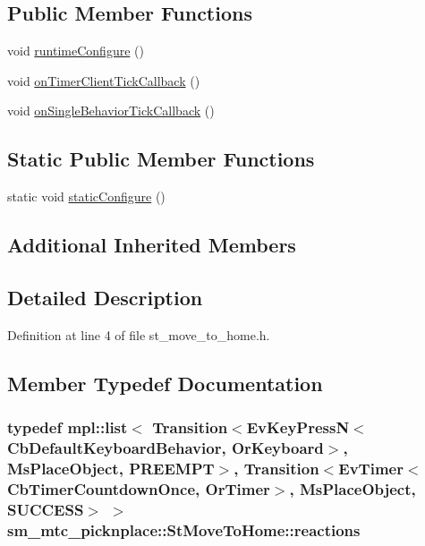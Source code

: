 \subsection*{Public Member Functions}
\begin{DoxyCompactItemize}
\item 
void \hyperlink{structsm__mtc__picknplace_1_1StMoveToHome_a7cafbff041d36ba4d3cbc1147f294a23}{runtime\+Configure} ()
\item 
void \hyperlink{structsm__mtc__picknplace_1_1StMoveToHome_adbd13708067b1a190dc1e414291b436c}{on\+Timer\+Client\+Tick\+Callback} ()
\item 
void \hyperlink{structsm__mtc__picknplace_1_1StMoveToHome_a6b9cf2b7da8ebdac16e8d881fc2c069c}{on\+Single\+Behavior\+Tick\+Callback} ()
\end{DoxyCompactItemize}
\subsection*{Static Public Member Functions}
\begin{DoxyCompactItemize}
\item 
static void \hyperlink{structsm__mtc__picknplace_1_1StMoveToHome_aeb7869c1a02be587f252a1dad72f0f39}{static\+Configure} ()
\end{DoxyCompactItemize}
\subsection*{Additional Inherited Members}


\subsection{Detailed Description}


Definition at line 4 of file st\+\_\+move\+\_\+to\+\_\+home.\+h.



\subsection{Member Typedef Documentation}
\subsubsection[{\texorpdfstring{reactions}{reactions}}]{\setlength{\rightskip}{0pt plus 5cm}typedef mpl\+::list$<$ Transition$<$Ev\+Key\+PressN$<$Cb\+Default\+Keyboard\+Behavior, {\bf Or\+Keyboard}$>$, {\bf Ms\+Place\+Object}, {\bf P\+R\+E\+E\+M\+PT}$>$, Transition$<$Ev\+Timer$<$Cb\+Timer\+Countdown\+Once, {\bf Or\+Timer}$>$, {\bf Ms\+Place\+Object}, {\bf S\+U\+C\+C\+E\+SS}$>$ $>$ {\bf sm\+\_\+mtc\+\_\+picknplace\+::\+St\+Move\+To\+Home\+::reactions}}\hypertarget{structsm__mtc__picknplace_1_1StMoveToHome_a2a0370866aac935b0e2648a67d56cb21}{}\label{structsm__mtc__picknplace_1_1StMoveToHome_a2a0370866aac935b0e2648a67d56cb21}



